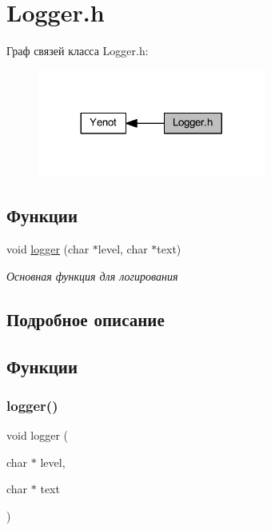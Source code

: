 \hypertarget{group__loggerh}{}\section{Logger.\+h}
\label{group__loggerh}
Граф связей класса Logger.\+h\+:
\nopagebreak
\begin{figure}[H]
\begin{center}
\leavevmode
\includegraphics[width=212pt]{group__loggerh}
\end{center}
\end{figure}
\subsection*{Функции}
\begin{DoxyCompactItemize}
\item 
void \mbox{\hyperlink{group__loggerh_ga0d6abeb129096910c85ae6cba8bb59cf}{logger}} (char $\ast$level, char $\ast$text)
\begin{DoxyCompactList}\small\item\em Основная функция для логирования \end{DoxyCompactList}\end{DoxyCompactItemize}


\subsection{Подробное описание}


\subsection{Функции}
\mbox{\label{group__loggerh_ga0d6abeb129096910c85ae6cba8bb59cf}} 
\subsubsection{\texorpdfstring{logger()}{logger()}}
{\footnotesize\ttfamily void logger (\begin{DoxyParamCaption}\item[{char $\ast$}]{level,  }\item[{char $\ast$}]{text }\end{DoxyParamCaption})}




